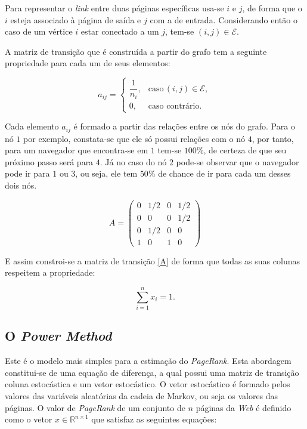 \documentclass[a4paper]{report} %
\begin{document}
Para representar o \textit{link} entre duas páginas específicas usa-se $i$ e $j$, de forma que o $i$ esteja associado à página de saída e $j$ com a de entrada. Considerando então o caso de um v\'ertice $i$ estar conectado a um $j$, tem-se $(i,j) \in \mathcal{E}$.

A matriz de transição que é construída a partir do grafo tem a seguinte propriedade para cada um de seus elementos:

\begin{equation}\label{a}
a_{ij} = \begin{cases}
\dfrac{1}{n_i}, & \text{caso}\, (i,j)\in \mathcal{E},\\
0, & \text{caso contr\'ario}.
\end{cases}
\end{equation}	

Cada elemento $a_{ij}$ é formado a partir das relações entre os nós do grafo. Para o nó $1$ por exemplo, constata-se que ele só possui relações com o nó $4$, por tanto, para um navegador que encontra-se em $1$ tem-se $100\%$, de certeza de que seu próximo passo será para $4$. Já no caso do nó $2$ pode-se observar que o navegador pode ir para $1$ ou $3$, ou seja, ele tem $50\%$ de chance de ir para cada um desses dois nós.

\begin{equation}\label{A}
A = \begin{pmatrix}
 0 & 1/2 & 0 & 1/2 \\
 0 &  0  & 0 & 1/2 \\
 0 & 1/2 & 0 &  0  \\
 1 &  0  & 1 &  0
\end{pmatrix}
\end{equation}

E assim constroi-se a matriz de transição \eqref{A} de forma que todas as suas colunas respeitem a propriedade:

\begin{equation}\label{n}
\sum^{n}_{i=1} x_{i} = 1.
\end{equation}

\subsection*{O \textit{Power Method}}

Este é o modelo mais simples para a estimação do \textit{PageRank}. Esta abordagem constitui-se de uma equação de diferença, a qual possui uma matriz de transição coluna estocástica e um vetor estocástico. O vetor estocástico é formado pelos valores das variáveis aleatórias da cadeia de Markov, ou seja os valores das páginas. O valor de \textit{PageRank} de um conjunto de $n$ páginas da \textit{Web} é definido como o vetor $x \in \mathbb{R}^{n \times 1}$ que satisfaz as seguintes equações:
\end{document}
